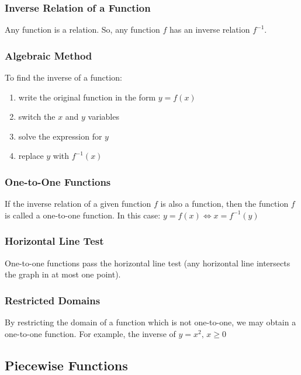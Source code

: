 \documentclass{article}
\begin{document}
	\subsubsection{Inverse Relation of a Function}
	Any function is a relation. So, any function $f$ has an inverse relation $f^{-1}$.
	\subsubsection{Algebraic Method}
	To find the inverse of a function:
	\begin{enumerate}
		\item write the original function in the form $y=f(x)$
		\item switch the $x$ and $y$ variables
		\item solve the expression for $y$
		\item replace $y$ with $f^{-1}(x)$
	\end{enumerate}
	\subsubsection{One-to-One Functions}
	If the inverse relation of a given function $f$ is also a function, then the function $f$ is called a one-to-one function. In this case: $y=f(x)\Leftrightarrow x=f^{-1}(y)$
	\subsubsection{Horizontal Line Test}
	One-to-one functions pass the horizontal line test (any horizontal line intersects the graph in at most one point).
	\subsubsection{Restricted Domains}
	By restricting the domain of a function which is not one-to-one, we may obtain a one-to-one function. For example, the inverse of $y=x^2\text{, }x\geqslant0$
	\subsection{Piecewise Functions}
\end{document}
